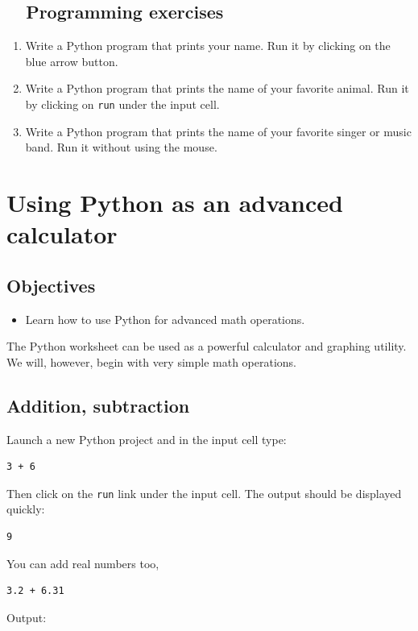 \subsection{\ \ Programming exercises}

\begin{enumerate}
\item Write a Python program that prints your name. Run it by clicking on the blue arrow button.
\item Write a Python program that prints the name of your favorite animal. 
      Run it by clicking on {\tt run} under the input cell.
\item Write a Python program that prints the name of your favorite singer 
      or music band. Run it without using the mouse.
\end{enumerate}

\section{Using Python as an advanced calculator}

\subsection{Objectives}

\begin{itemize}
\item Learn how to use Python for advanced math operations.
\end{itemize}
The Python worksheet can be used as a powerful calculator and graphing utility. 
We will, however, begin with very simple math operations.

\subsection{Addition, subtraction}

Launch a new Python project and in the input cell type:

\begin{verbatim}
3 + 6
\end{verbatim}
Then click on the {\tt run} link under the input cell. The output should be displayed quickly:

\begin{verbatim}
9
\end{verbatim}
You can add real numbers too,
\begin{verbatim}
3.2 + 6.31
\end{verbatim}
Output:

